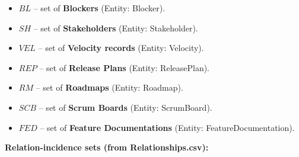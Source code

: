 \documentclass[11pt,a4paper]{article}
\begin{document}
\begin{itemize}
  \item $BL$ -- set of \textbf{Blockers} (Entity: Blocker).
  \item $SH$ -- set of \textbf{Stakeholders} (Entity: Stakeholder).
  \item $VEL$ -- set of \textbf{Velocity records} (Entity: Velocity).
  \item $REP$ -- set of \textbf{Release Plans} (Entity: ReleasePlan).
  \item $RM$ -- set of \textbf{Roadmaps} (Entity: Roadmap).
  \item $SCB$ -- set of \textbf{Scrum Boards} (Entity: ScrumBoard).
  \item $FED$ -- set of \textbf{Feature Documentations} (Entity: FeatureDocumentation).
\end{itemize}

\medskip
\noindent \textbf{Relation-incidence sets (from Relationships.csv):}
\end{document}
